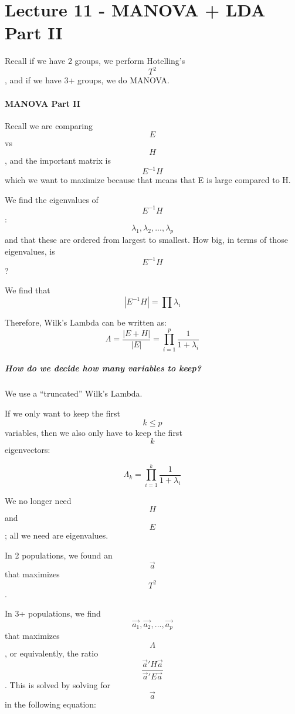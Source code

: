 \hypertarget{lecture-11---manova-lda-part-ii}{%
\chapter{Lecture 11 - MANOVA + LDA Part
II}\label{lecture-11---manova-lda-part-ii}}

Recall if we have 2 groups, we perform Hotelling's \[T^2\], and if we
have 3+ groups, we do MANOVA.

\hypertarget{manova-part-ii}{%
\subsubsection{\texorpdfstring{MANOVA \textbf{Part
II}}{MANOVA Part II}}\label{manova-part-ii}}

Recall we are comparing \[E\] vs \[H\], and the important matrix is
\[E^{-1}H\] which we want to maximize because that means that E is large
compared to H.

We find the eigenvalues of \[E^{-1}H\]:
\[\lambda_1, \lambda_2, ..., \lambda_p\] and that these are ordered from
largest to smallest. How big, in terms of those eigenvalues, is
\[E^{-1}H\]?

We find that \[| E^{-1}H | = \prod \lambda_i\]

Therefore, Wilk's Lambda can be written as:
\[\Lambda = \frac{| E + H |}{| E |} = \prod_{i = 1}^p \frac{1}{1 + \lambda_i}\]

\hypertarget{how-do-we-decide-how-many-variables-to-keep}{%
\paragraph{How do we decide how many variables to
keep?}\label{how-do-we-decide-how-many-variables-to-keep}}

We use a ``truncated'' Wilk's Lambda.

If we only want to keep the first \[k \le p\] variables, then we also
only have to keep the first \[k\] eigenvectors:

\[\Lambda_k =  \prod_{i = 1}^k \frac{1}{1 + \lambda_i}\]

We no longer need \[H\] and \[E\]; all we need are eigenvalues.

In 2 populations, we found an \[\vec{a}\] that maximizes \[T^2\].

In 3+ populations, we find \[\vec{a_1}, \vec{a_2}, ..., \vec{a_p}\] that
maximizes \[\Lambda\], or equivalently, the
ratio\[\frac{\vec{a}'H\vec{a}}{\vec{a}'E\vec{a}}\]. This is solved by
solving for \[\vec{a}\] in the following equation:

